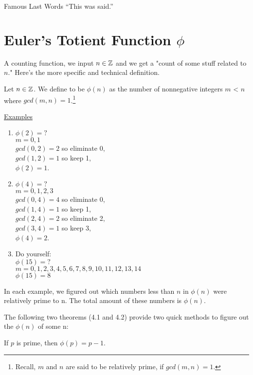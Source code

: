 \begin{chapquote}{Famous Last Words}
``This was said.''
\end{chapquote}

\section{Euler's Totient Function $\phi$}
A counting function, we input $n \in \mathbb{Z}$ and we get a "count of some stuff related to $n$."  Here's the more specific and technical definition.  

\begin{definition} Let $n \in \mathbb{Z}$.  We define  to be $\phi(n)$ as the number of nonnegative integers $m$ < $n$ where $gcd(m,n) = 1$.\footnote{Recall, $m$ and $n$ are said to be relatively prime, if $gcd(m,n) = 1$.}
\end{definition}

\underline{Examples}
\begin{enumerate}
\item $\phi(2) = ?$\\$m = 0,1$\\$gcd(0,2) = 2$ so eliminate 0,\\$gcd(1,2) = 1$ so keep 1,\\$\phi(2) = 1$.
\item $\phi(4) = ?$\\$m = 0,1,2,3$\\$gcd(0,4) = 4$ so eliminate 0,\\$gcd(1,4) = 1$ so keep 1,\\$gcd(2,4) = 2$ so eliminate 2,\\$gcd(3,4) = 1$ so keep 3,\\$\phi(4) = 2$.
\item Do yourself:\\$\phi(15) = ?$\\$m = 0,1,2,3,4,5,6,7,8,9,10,11,12,13,14$\\$\phi(15) = 8$
\end{enumerate}
In each example, we figured out which numbers less than $n$ in $\phi(n)$ were relatively prime to n.  The total amount of these numbers is $\phi(n)$. 


\vspace{5mm}
The following two theorems (4.1 and 4.2) provide two quick methods to figure out the $\phi(n)$ of some n:

\begin{theorem}
If $p$ is prime, then $\phi(p) = p - 1$.
\end{theorem}

